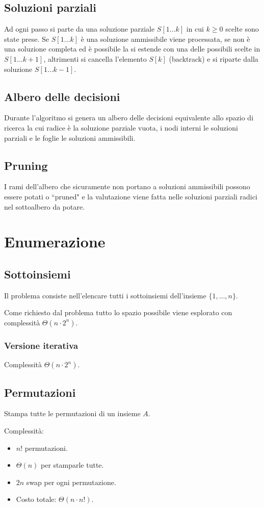 \subsection{Soluzioni parziali}
Ad ogni passo si parte da una soluzione parziale $S[1\dots k]$ in cui $k\ge 0$ scelte sono state prese. Se $S[1\dots k]$ \`e una soluzione ammissibile viene processata, se non \`e 
una soluzione completa ed \`e possibile la si estende con una delle possibili scelte in $S[1\dots k+1]$, altrimenti si cancella l'elemento $S[k]$ (backtrack) e si riparte dalla 
soluzione $S[1\dots k-1]$.
\subsection{Albero delle decisioni}
Durante l'algoritmo si genera un albero delle decisioni equivalente allo spazio di ricerca la cui radice \`e la soluzione parziale vuota, i nodi interni le soluzioni parziali e le
foglie le soluzioni ammissibili.
\subsection{Pruning}
I rami dell'albero che sicuramente non portano a soluzioni ammissibili possono essere potati o ``pruned" e la valutazione viene fatta nelle soluzioni parziali radici nel sottoalbero da
potare.
\section{Enumerazione}

\subsection{Sottoinsiemi}
Il problema consiste nell'elencare tutti i sottoinsiemi dell'insieme $\{1, \dots, n\}$.
\begin{multicols}{2}

\columnbreak


\end{multicols}
Come richiesto dal problema tutto lo spazio possibile viene esplorato con complessit\`a $\Theta(n\cdot 2^n)$.
\subsubsection{Versione iterativa}

Complessit\`a $\Theta(n\cdot 2^n)$.
\subsection{Permutazioni}
Stampa tutte le permutazioni di un insieme $A$.
\begin{multicols}{2}

\columnbreak

Complessit\`a:
\begin{itemize}
	\item $n!$ permutazioni.
	\item $\Theta(n)$ per stamparle tutte.
	\item $2n$ swap per ogni permutazione.
	\item Costo totale: $\Theta(n\cdot n!)$.
\end{itemize}
\end{multicols}

